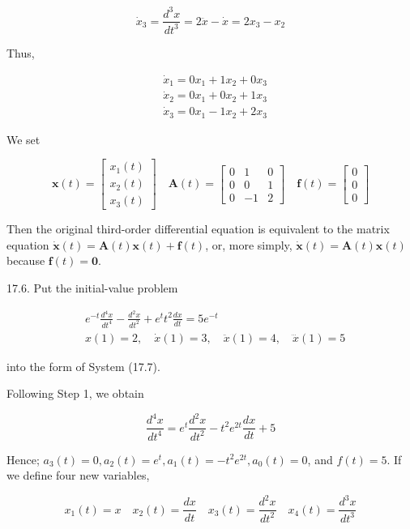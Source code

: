 \documentclass[10pt]{article}
\begin{document}
$$
\dot{x}_{3}=\frac{d^{3} x}{d t^{3}}=2 \ddot{x}-\dot{x}=2 x_{3}-x_{2}
$$

Thus,

$$
\begin{aligned}
& \dot{x}_{1}=0 x_{1}+1 x_{2}+0 x_{3} \\
& \dot{x}_{2}=0 x_{1}+0 x_{2}+1 x_{3} \\
& \dot{x}_{3}=0 x_{1}-1 x_{2}+2 x_{3}
\end{aligned}
$$

We set

$$
\mathbf{x}(t)=\left[\begin{array}{l}
x_{1}(t) \\
x_{2}(t) \\
x_{3}(t)
\end{array}\right] \quad \mathbf{A}(t)=\left[\begin{array}{rrr}
0 & 1 & 0 \\
0 & 0 & 1 \\
0 & -1 & 2
\end{array}\right] \quad \mathbf{f}(t)=\left[\begin{array}{l}
0 \\
0 \\
0
\end{array}\right]
$$

Then the original third-order differential equation is equivalent to the matrix equation $\dot{\mathbf{x}}(t)=\mathbf{A}(t) \mathbf{x}(t)+\mathbf{f}(t)$, or, more simply, $\dot{\mathbf{x}}(t)=\mathbf{A}(t) \mathbf{x}(t)$ because $\mathbf{f}(t)=\mathbf{0}$.

17.6. Put the initial-value problem

$$
\begin{aligned}
& e^{-t} \frac{d^{4} x}{d t^{4}}-\frac{d^{2} x}{d t^{2}}+e^{t} t^{2} \frac{d x}{d t}=5 e^{-t} \\
& x(1)=2, \quad \dot{x}(1)=3, \quad \ddot{x}(1)=4, \quad \dddot{x}(1)=5
\end{aligned}
$$

into the form of System (17.7).

Following Step 1, we obtain

$$
\frac{d^{4} x}{d t^{4}}=e^{t} \frac{d^{2} x}{d t^{2}}-t^{2} e^{2 t} \frac{d x}{d t}+5
$$

Hence; $a_{3}(t)=0, a_{2}(t)=e^{t}, a_{1}(t)=-t^{2} e^{2 t}, a_{0}(t)=0$, and $f(t)=5$. If we define four new variables,

$$
x_{1}(t)=x \quad x_{2}(t)=\frac{d x}{d t} \quad x_{3}(t)=\frac{d^{2} x}{d t^{2}} \quad x_{4}(t)=\frac{d^{3} x}{d t^{3}}
$$
\end{document}
